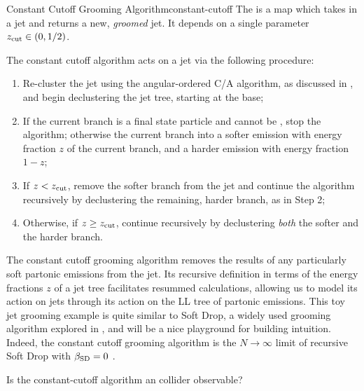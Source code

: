 \begin{definitionbox}{Constant Cutoff Grooming Algorithm}{constant-cutoff}
    The  is a map which takes in a jet and returns a new, \textit{groomed} jet.
    It depends on a single parameter \(z_{\rm cut} \in (0, 1/2)\).

    The constant cutoff algorithm acts on a jet via the following procedure:
    \begin{enumerate}
        \item
            Re-cluster the jet using the angular-ordered C/A algorithm, as discussed in , and begin \gls{declustering} the jet tree, starting at the base;

        \item
            If the current branch is a final state particle and cannot be , stop the algorithm;
            otherwise  the current branch into a softer emission with energy fraction \(z\) of the current branch, and a harder emission with energy fraction \(1-z\);

        \item
            If \(z < z_{\rm cut}\), remove the softer branch from the jet and continue the algorithm recursively by declustering the remaining, harder branch, as in Step 2;

        \item
            Otherwise, if \(z \geq z_{\rm cut}\), continue recursively by \gls{declustering} \textit{both} the softer and the harder branch.
    \end{enumerate}
\end{definitionbox}

    The constant cutoff grooming algorithm removes the results of any particularly soft partonic emissions from the jet.
    Its recursive definition in terms of the energy fractions \(z\) of a  jet tree facilitates resummed calculations, allowing us to model its action on jets through its action on the LL tree of partonic emissions.
    This toy jet grooming example is quite similar to Soft Drop, a widely used grooming algorithm explored in , and will be a nice playground for building intuition.
    Indeed, the constant cutoff grooming algorithm is the \(N \to \infty\) limit of recursive Soft Drop with \(\beta_\text{SD}=0\) \cite{Dreyer:2018tjj}.

\begin{exercise}{}{}
    Is the \gls{constant-cutoff} algorithm an  collider observable?
\end{exercise}



